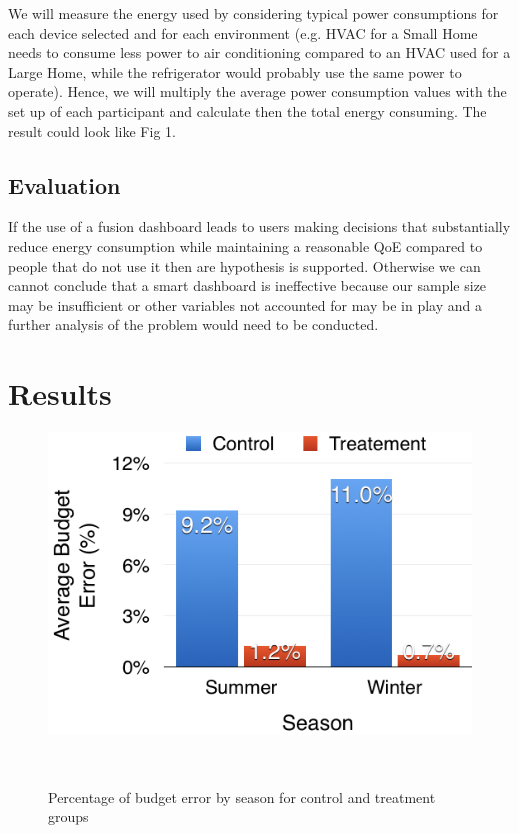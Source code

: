 \documentclass{sigchi}
\begin{document}
We will measure the energy used by considering typical power consumptions for each device selected and for each environment (e.g. HVAC for a Small Home needs to consume less power to air conditioning compared to an HVAC used for a Large Home, while the refrigerator would probably use the same power to operate). Hence, we will multiply the average power consumption values with the set up of each participant and calculate then the total energy consuming. The result could look like Fig 1.

\subsection{Evaluation}

If the use of a fusion dashboard leads to users making decisions that substantially reduce energy consumption while maintaining a reasonable QoE compared to people that do not use it then are hypothesis is supported. Otherwise we can cannot conclude that a smart dashboard is ineffective because our sample size may be insufficient or other variables not accounted for may be in play and a further analysis of the problem would need to be conducted.

\section{Results}

\begin{figure}
\centering
  \includegraphics[width=0.9\columnwidth]{figures/errors}
  \caption{Percentage of budget error by season for control and treatment groups }~\label{fig:figure1}
\end{figure}
\end{document}
